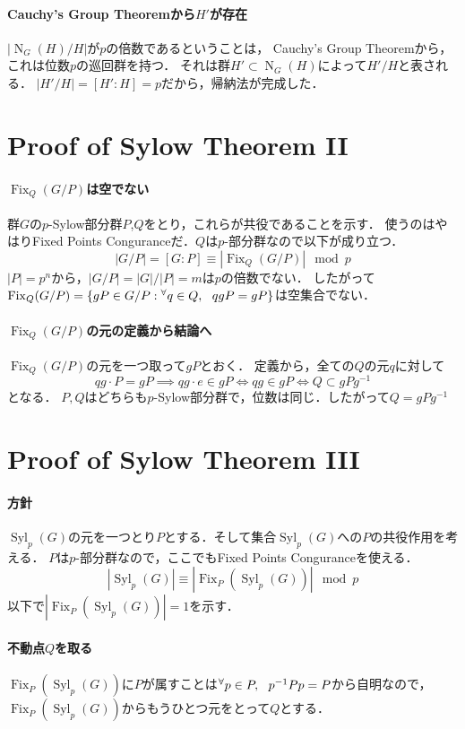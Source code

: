 \documentclass[a4paper]{jsarticle}
\newcommand{\Fix}{\operatorname{Fix}}
\newcommand{\Norm}{\operatorname{N}}
\newcommand{\Syl}{\operatorname{Syl}}
\begin{document}
    \paragraph{Cauchy's Group Theoremから$H'$が存在}
    $|\Norm_G(H)/H|$が$p$の倍数であるということは，
    Cauchy's Group Theoremから，これは位数$p$の巡回群を持つ．
    それは群$H' \subset \Norm_G(H)$によって$H'/H$と表される．
    $|H'/H|=[H':H]=p$だから，帰納法が完成した．
    

    \section{Proof of Sylow Theorem II}
    \paragraph{$\Fix_Q(G/P)$は空でない}
    群$G$の$p$-Sylow部分群$P$,$Q$をとり，これらが共役であることを示す．
    使うのはやはりFixed Points Conguranceだ．$Q$は$p$-部分群なので以下が成り立つ．
    \[ |G/P|=[G:P] \equiv |\Fix_Q(G/P)| \mod p \]
    $|P|=p^n$から，$|G/P|=|G|/|P|=m$は$p$の倍数でない．
    したがって$\Fix_Q(G/P)=\{ gP \in G/P : \Forall{q \in Q} qgP=gP \}$は空集合でない．

    \paragraph{$\Fix_Q(G/P)$の元の定義から結論へ}
    $\Fix_Q(G/P)$の元を一つ取って$gP$とおく．
    定義から，全ての$Q$の元$q$に対して
    \[ qg \cdot P=gP \implies qg \cdot e \in gP \iff qg \in gP \iff Q \subset gPg^{-1} \]となる．
    $P,Q$はどちらも$p$-Sylow部分群で，位数は同じ．したがって$Q=gPg^{-1}$
    

    \section{Proof of Sylow Theorem III}
    \paragraph{方針}
    $\Syl_p(G)$の元を一つとり$P$とする．そして集合$\Syl_p(G)$への$P$の共役作用を考える．
    $P$は$p$-部分群なので，ここでもFixed Points Conguranceを使える．
    \[ |\Syl_p(G)| \equiv |\Fix_P(\Syl_p(G))| \mod p\]
    以下で$|\Fix_P(\Syl_p(G))|=1$を示す．

    \paragraph{不動点$Q$を取る}
    $\Fix_P(\Syl_p(G))$に$P$が属すことは${}^{\forall} p \in P,~~ p^{-1}Pp=P$から自明なので，
    $\Fix_P(\Syl_p(G))$からもうひとつ元をとって$Q$とする．
\end{document}
